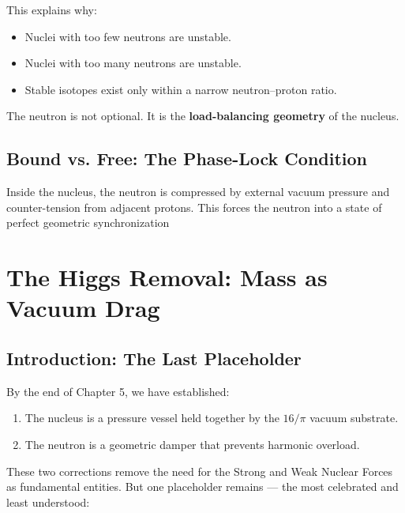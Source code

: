 \documentclass[11pt, letterpaper, openany]{book}
\begin{document}
This explains why:

\begin{itemize}
    \item Nuclei with too few neutrons are unstable.
    \item Nuclei with too many neutrons are unstable.
    \item Stable isotopes exist only within a narrow neutron–proton ratio.
\end{itemize}

The neutron is not optional.  
It is the \textbf{load-balancing geometry} of the nucleus.

\section{Bound vs. Free: The Phase-Lock Condition}

Inside the nucleus, the neutron is compressed by external vacuum pressure and counter-tension from adjacent protons.  
This forces the neutron into a state of perfect geometric synchronization


\chapter{The Higgs Removal: Mass as Vacuum Drag}
\label{ch:higgs_removal}

\section{Introduction: The Last Placeholder}

By the end of Chapter 5, we have established:

\begin{enumerate}
    \item The nucleus is a pressure vessel held together by the $16/\pi$ vacuum substrate.
    \item The neutron is a geometric damper that prevents harmonic overload.
\end{enumerate}

These two corrections remove the need for the Strong and Weak Nuclear Forces as fundamental entities.  
But one placeholder remains — the most celebrated and least understood:
\end{document}
